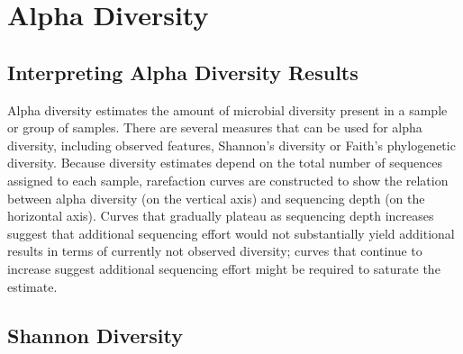 \documentclass[10pt,notitlepage,onecolumn,aps,pra]{revtex4-1}
\begin{document}
    \pagebreak

    \hypertarget{alpha-diversity}{%
\section{Alpha Diversity}\label{alpha-diversity}}

    \hypertarget{interpreting-alpha-diversity-results}{%
\subsection{Interpreting Alpha Diversity
Results}\label{interpreting-alpha-diversity-results}}

    Alpha diversity estimates the amount of microbial diversity present in a
sample or group of samples. There are several measures that can be used
for alpha diversity, including observed features, Shannon's diversity or
Faith's phylogenetic diversity. Because diversity estimates depend on
the total number of sequences assigned to each sample, rarefaction
curves are constructed to show the relation between alpha diversity (on
the vertical axis) and sequencing depth (on the horizontal axis). Curves
that gradually plateau as sequencing depth increases suggest that
additional sequencing effort would not substantially yield additional
results in terms of currently not observed diversity; curves that
continue to increase suggest additional sequencing effort might be
required to saturate the estimate.

    \hypertarget{shannon-diversity}{%
\subsection{Shannon Diversity}\label{shannon-diversity}}

    
    \begin{center}
    \end{center}
    { \hspace*{\fill} \\}
    
\end{document}
